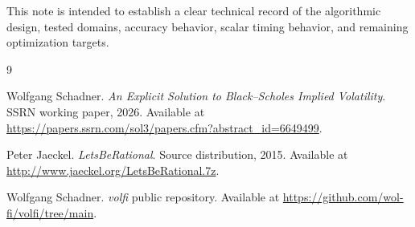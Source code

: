 \documentclass[11pt]{article}
\begin{document}
	This note is intended to establish a clear technical record of the algorithmic design, tested domains, accuracy behavior, scalar timing behavior, and remaining optimization targets.
	
	\begin{thebibliography}{9}
		
		Wolfgang Schadner.
		\newblock \emph{An Explicit Solution to Black--Scholes Implied Volatility}.
		\newblock SSRN working paper, 2026.
		\newblock Available at \url{https://papers.ssrn.com/sol3/papers.cfm?abstract_id=6649499}.
		
		Peter Jaeckel.
		\newblock \emph{LetsBeRational}.
		\newblock Source distribution, 2015.
		\newblock Available at \url{http://www.jaeckel.org/LetsBeRational.7z}.
		
		Wolfgang Schadner.
		\newblock \emph{volfi} public repository.
		\newblock Available at \url{https://github.com/wol-fi/volfi/tree/main}.
		
	\end{thebibliography}
	
\end{document}
